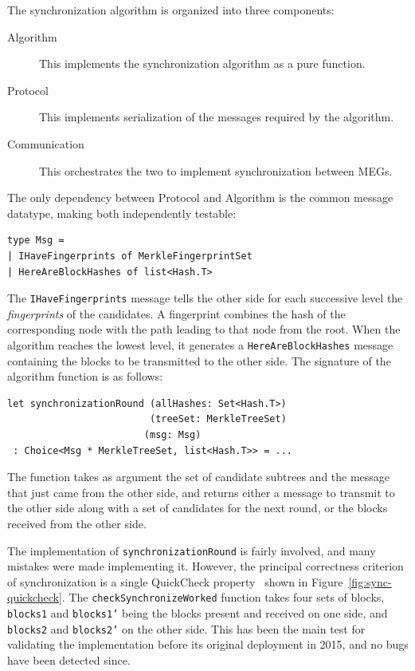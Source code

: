 \documentclass[sigplan,review]{acmart}
\begin{document}
The synchronization algorithm is organized into three components:
%
\begin{description}
\item[Algorithm] This implements the synchronization algorithm as a
  pure function.
\item[Protocol] This implements serialization of the messages
  required by the algorithm.
\item[Communication] This orchestrates the two to implement
  synchronization between MEGs.
\end{description}
%
The only dependency between Protocol and Algorithm is the common
message datatype, making both independently testable:
%
\begin{verbatim}
type Msg =
| IHaveFingerprints of MerkleFingerprintSet
| HereAreBlockHashes of list<Hash.T>
\end{verbatim}
%
The \texttt{IHaveFingerprints} message tells the other side for each
successive level the \textit{fingerprints} of the candidates.  A
fingerprint combines the hash of the corresponding
node with the path leading to that node from the root.  When the
algorithm reaches the lowest level, it generates a
\texttt{Here\-Are\-Block\-Hashes} message containing the blocks to be
transmitted to the other side.
The signature of the algorithm function is as follows:
\begin{verbatim}
let synchronizationRound (allHashes: Set<Hash.T>)
                         (treeSet: MerkleTreeSet)
                        (msg: Msg)
 : Choice<Msg * MerkleTreeSet, list<Hash.T>> = ...
\end{verbatim}
%
The function takes as argument the set of candidate subtrees and the
message that just came from the other side, and returns either a
message to transmit to the other side along with a set of candidates
for the next round, or the blocks received from the other side.

The implementation of \texttt{synchronizationRound} is fairly
involved, and many mistakes were made implementing it. However, the principal
correctness criterion of synchronization is a single QuickCheck
property~\cite{QuickCheck2000} shown in
Figure~\ref{fig:sync-quickcheck}.  The \texttt{check\-Synchronize\-Worked}
function takes four sets of blocks, \texttt{blocks1} and
\texttt{blocks1'} being the blocks present and received on one side,
and \texttt{blocks2} and \texttt{blocks2'} on the other side.  This
has been the main test for validating the implementation before its
original deployment in 2015, and no bugs have been detected since.
\end{document}
